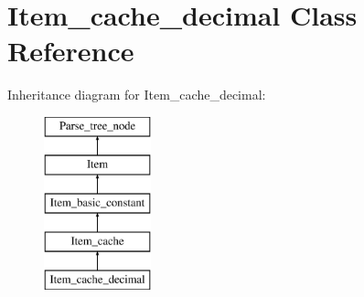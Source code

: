 \hypertarget{classItem__cache__decimal}{}\section{Item\+\_\+cache\+\_\+decimal Class Reference}
\label{classItem__cache__decimal}
Inheritance diagram for Item\+\_\+cache\+\_\+decimal\+:\begin{figure}[H]
\begin{center}
\leavevmode
\includegraphics[height=5.000000cm]{classItem__cache__decimal}
\end{center}
\end{figure}
